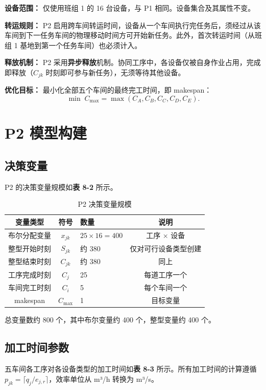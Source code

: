 \documentclass[UTF8,a4paper,12pt]{ctexart}
\begin{document}
\textbf{设备范围：} 仅使用班组 1 的 16 台设备，与 P1 相同。设备集合及其属性不变。

\textbf{转运规则：} P2 启用跨车间转运时间，设备从一个车间执行完任务后，须经过从该车间到下一任务车间的物理移动时间方可开始新任务。此外，首次转运时间（从班组 1 基地到第一个任务车间）也必须计入。

\textbf{释放机制：} P2 采用\textbf{异步释放}机制。协同工序中，各设备仅被自身作业占用，完成即释放（$C_{jk}$ 时刻即可参与新任务），无须等待其他设备。

\textbf{优化目标：} 最小化全部五个车间的最终完工时间，即 makespan：
\begin{equation}
\min \; C_{\max} = \max(C_A, C_B, C_C, C_D, C_E). \tag{8-1}
\end{equation}

\section{P2 模型构建}
\subsection{决策变量}
P2 的决策变量规模如\textbf{表 8-2} 所示。

\begin{table}[htbp]
  \centering
  \caption{P2 决策变量规模}
  \label{tab:var_scale}
  \begin{tabular}{cclc}
    \toprule
    变量类型 & 符号 & 数量 & 说明 \\
    \midrule
    布尔分配变量 & $x_{jk}$ & $25 \times 16 = 400$ & 工序 × 设备 \\
    整型开始时刻 & $S_{jk}$ & 约 380 & 仅对可行设备类型创建 \\
    整型结束时刻 & $C_{jk}$ & 约 380 & 同上 \\
    工序完成时刻 & $C_j$ & 25 & 每道工序一个 \\
    车间完工时刻 & $C_i$ & 5 & 每个车间一个 \\
    makespan & $C_{\max}$ & 1 & 目标变量 \\
    \bottomrule
  \end{tabular}
\end{table}

总变量数约 800 个，其中布尔变量约 400 个，整型变量约 400 个。

\subsection{加工时间参数}
五车间各工序对各设备类型的加工时间如\textbf{表 8-3} 所示。所有加工时间的计算遵循 $p_{jk} = \lceil q_j / e_{j,r} \rceil$，效率单位从 m³/h 转换为 m³/s。
\end{document}
